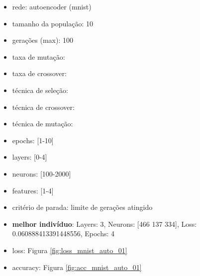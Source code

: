 \documentclass[twoside,conference,a4paper]{IEEEtran}
\begin{document}
\begin{itemize}
    \item rede: autoencoder (mnist)
    \item tamanho da população: 10
    \item gerações (max): 100
    \item taxa de mutação:
    \item taxa de crossover:
    \item técnica de seleção:
    \item técnica de crossover:
    \item técnica de mutação:
    \item epochs: [1-10]
    \item layers: [0-4]
    \item neurons: [100-2000]
    \item features: [1-4]
    \item critério de parada: limite de gerações atingido
    \item \textbf{melhor indivíduo}: Layers: 3, Neurons: [466 137 334], Loss: 0.060888413391448556, Epochs: 4
    \item loss: Figura \ref{fig:loss_mnist_auto_01}
    \item accuracy: Figura \ref{fig:acc_mnist_auto_01}
\end{itemize}
\end{document}
